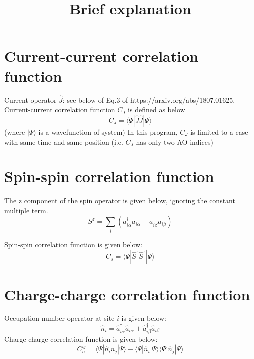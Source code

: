 \documentclass{article}
\begin{document}
\title{Brief explanation}
\maketitle


\section{Current-current correlation function}
Current operator $\hat{J}$: see below of Eq.3 of https://arxiv.org/abs/1807.01625.
Current-current correlation function $C_{J}$ is defined as below
\begin{equation}
C_{J} = \langle \Psi | \hat{J}\hat{J} | \Psi \rangle
\end{equation}
(where $|\Psi\rangle$ is a wavefunction of system)
In this program, $C_{J}$ is limited to a case with same time and same position (i.e. $C_{J}$ has only two AO indices)

\section{Spin-spin correlation function}
The z component of the spin operator is given below, ignoring the constant multiple term.
\begin{equation}
    S^{z} = \sum_{i} (a^{\dagger}_{i\alpha}a_{i\alpha} - a^{\dagger}_{i\beta}a_{i\beta})
\end{equation}

Spin-spin correlation function is given below:
\begin{equation}
C_{s} = \langle \Psi | \hat{S}^{z}\hat{S}^{z} | \Psi \rangle
\end{equation}

\section{Charge-charge correlation function}
Occupation number operator at site $i$ is given below:
\begin{equation}
\hat{n}_{i} = \hat{a}^{\dagger}_{i\alpha}\hat{a}_{i\alpha} + \hat{a}^{\dagger}_{i\beta}\hat{a}_{i\beta}
\end{equation}
Charge-charge correlation function is given below:
\begin{equation}
C_{n}^{ij} = \langle \Psi | \hat{n}_{i}\hat{n}_{j} | \Psi \rangle
- \langle \Psi | \hat{n}_{i} | \Psi \rangle
\langle \Psi | \hat{n}_{j} | \Psi \rangle
\end{equation}
\end{document}

